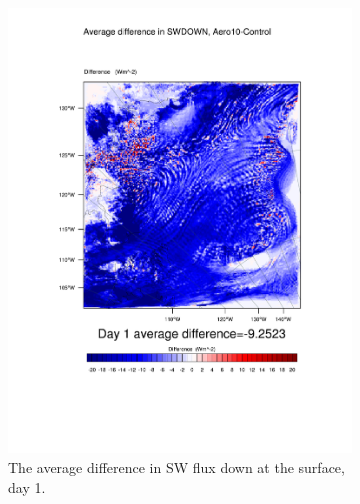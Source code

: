 \begin{figure}
\centering
	\begin{subfigure}{0.48\textwidth}
		\includegraphics[width=\textwidth]{results/aero10/diff_Aero10_SWDOWN_Day1.pdf}
		\caption{The average difference in SW flux down at the surface, day 1.}
		\label{subfig:swdown_r3Day1}
	\end{subfigure}
	\quad
	\begin{subfigure}{0.48\textwidth}
		\centering

\end{subfigure}
\end{figure}
